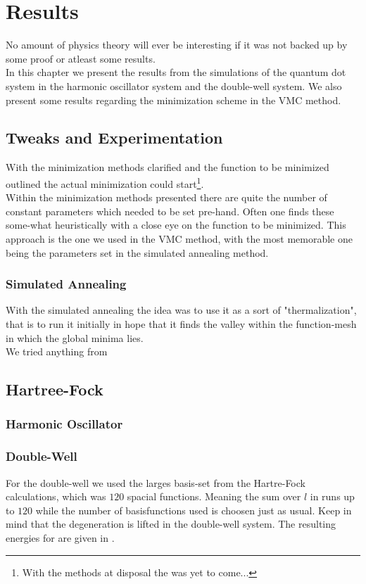 \chapter{Results \label{chapter:6}}
    No amount of physics theory will ever be interesting if it was not backed
    up by some proof or atleast some results. \\
    In this chapter we present the results from the simulations of the quantum
    dot system in the harmonic oscillator system and the double-well system. We
    also present some results regarding the minimization scheme in the VMC
    method.

\section{Tweaks and Experimentation}
    With the minimization methods clarified and the function to be minimized
    outlined the actual minimization could start\footnote{With the methods at
    disposal the  was yet to come...}. \\
    Within the minimization methods presented there are quite the number of
    constant parameters which needed to be set pre-hand. Often one finds these
    some-what heuristically with a close eye on the function to be minimized.
    This approach is the one we used in the VMC method, with the most memorable
    one being the parameters set in the simulated annealing method.

\subsection{Simulated Annealing}
    With the simulated annealing the idea was to use it as a sort of
    "thermalization", that is to run it initially in hope that it finds the
    valley within the function-mesh in which the global minima lies. \\
    We tried anything from 

\section{Hartree-Fock}
\subsection{Harmonic Oscillator}
    
    

\subsection{Double-Well\label{sec:dwbimp}}
    For the double-well we used the larges basis-set from the Hartre-Fock
    calculations, which was $120$ spacial functions. Meaning the sum over $l$
    in  runs up to $120$ while the number of
    basisfunctions used is choosen just as usual. Keep in mind that the
    degeneration is lifted in the double-well system. The resulting energies
    for are given in .
    
    

